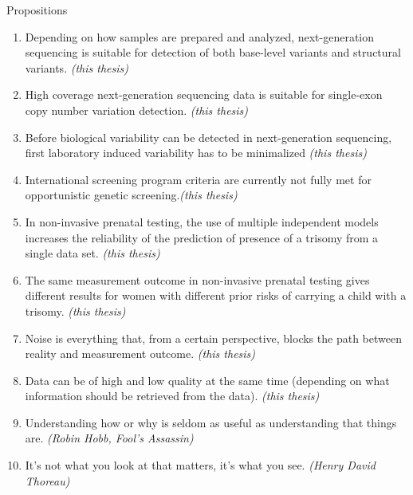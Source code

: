 \clearpage
\null\newpage

\noindent
	\Large
Propositions

\small

\begin{enumerate}
	
	\item Depending on how samples are prepared and analyzed, next-generation sequencing is suitable for detection of both base-level variants and structural variants. \textsl{(this thesis)}
	
	\item High coverage next-generation sequencing data is suitable for single-exon copy number variation detection. \textsl{(this thesis)}
	
	\item Before biological variability can be detected in next-generation sequencing, first laboratory induced variability has to be minimalized \textsl{(this thesis)}
	
	\item International screening program criteria  are currently not fully met for opportunistic genetic screening.\textsl{(this thesis)}
	
	\item In non-invasive prenatal testing, the use of multiple independent models increases the reliability of  the prediction of presence of a trisomy from a single data set. \textsl{(this thesis)}
	
	\item The same measurement outcome in non-invasive prenatal testing gives different results for women with different prior risks of carrying a child with a trisomy. \textsl{(this thesis)}
	
	\item Noise is everything that, from a certain perspective, blocks the path between reality and measurement outcome. \textsl{(this thesis)}
	
	\item Data can be of high and low quality at the same time (depending on what information should be retrieved from the data). \textsl{(this thesis)}
	
	\item Understanding how or why is seldom as useful as understanding that things are. \textsl{(Robin Hobb, Fool's Assassin)}
	
	\item It’s not what you look at that matters, it’s what you see. \textsl{(Henry David Thoreau)}
	
\end{enumerate}

\null\newpage